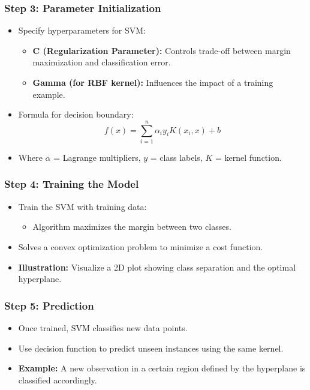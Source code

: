 \documentclass{beamer}
\begin{document}
\begin{frame}[fragile]
    \frametitle{Step 3: Parameter Initialization}
    \begin{itemize}
        \item Specify hyperparameters for SVM:
        \begin{itemize}
            \item \textbf{C (Regularization Parameter):} Controls trade-off between margin maximization and classification error.
            \item \textbf{Gamma (for RBF kernel):} Influences the impact of a training example.
        \end{itemize}
        \item Formula for decision boundary:
        \begin{equation}
            f(x) = \sum_{i=1}^{n} \alpha_i y_i K(x_i, x) + b
        \end{equation}
        \item Where \( \alpha \) = Lagrange multipliers, \( y \) = class labels, \( K \) = kernel function.
    \end{itemize}
\end{frame}

\begin{frame}[fragile]
    \frametitle{Step 4: Training the Model}
    \begin{itemize}
        \item Train the SVM with training data:
        \begin{itemize}
            \item Algorithm maximizes the margin between two classes.
        \end{itemize}
        \item Solves a convex optimization problem to minimize a cost function.
        \item \textbf{Illustration:} Visualize a 2D plot showing class separation and the optimal hyperplane.
    \end{itemize}
\end{frame}

\begin{frame}[fragile]
    \frametitle{Step 5: Prediction}
    \begin{itemize}
        \item Once trained, SVM classifies new data points.
        \item Use decision function to predict unseen instances using the same kernel.
        \item \textbf{Example:} A new observation in a certain region defined by the hyperplane is classified accordingly.
    \end{itemize}
\end{frame}
\end{document}
